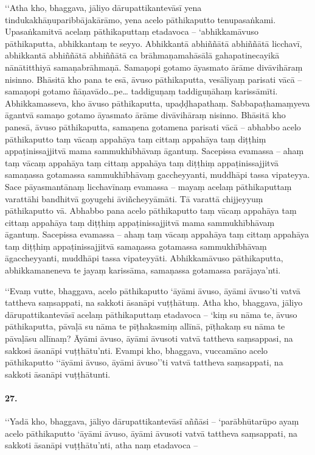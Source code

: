 ‘‘Atha kho, bhaggava, jāliyo dārupattikantevāsī yena tindukakhāṇuparibbājakārāmo, yena acelo pāthikaputto tenupasaṅkami. Upasaṅkamitvā acelaṃ pāthikaputtaṃ etadavoca – ‘abhikkamāvuso pāthikaputta, abhikkantaṃ te seyyo. Abhikkantā abhiññātā abhiññātā licchavī, abhikkantā abhiññātā abhiññātā ca brāhmaṇamahāsālā gahapatinecayikā nānātitthiyā samaṇabrāhmaṇā. Samaṇopi gotamo āyasmato ārāme divāvihāraṃ nisinno. Bhāsitā kho pana te esā, āvuso pāthikaputta, vesāliyaṃ parisati vācā – samaṇopi gotamo ñāṇavādo…pe… taddiguṇaṃ taddiguṇāhaṃ karissāmīti. Abhikkamasseva, kho āvuso pāthikaputta, upaḍḍhapathaṃ. Sabbapaṭhamaṃyeva āgantvā samaṇo gotamo āyasmato ārāme divāvihāraṃ nisinno. Bhāsitā kho panesā, āvuso pāthikaputta, samaṇena gotamena parisati vācā – abhabbo acelo pāthikaputto taṃ vācaṃ appahāya taṃ cittaṃ appahāya taṃ diṭṭhiṃ appaṭinissajjitvā mama sammukhībhāvaṃ āgantuṃ. Sacepissa evamassa – ahaṃ taṃ vācaṃ appahāya taṃ cittaṃ appahāya taṃ diṭṭhiṃ appaṭinissajjitvā samaṇassa gotamassa sammukhībhāvaṃ gaccheyyanti, muddhāpi tassa vipateyya. Sace pāyasmantānaṃ licchavīnaṃ evamassa – mayaṃ acelaṃ pāthikaputtaṃ varattāhi bandhitvā goyugehi āviñcheyyāmāti. Tā varattā chijjeyyuṃ pāthikaputto vā. Abhabbo pana acelo pāthikaputto taṃ vācaṃ appahāya taṃ cittaṃ appahāya taṃ diṭṭhiṃ appaṭinissajjitvā mama sammukhībhāvaṃ āgantuṃ. Sacepissa evamassa – ahaṃ taṃ vācaṃ appahāya taṃ cittaṃ appahāya taṃ diṭṭhiṃ appaṭinissajjitvā samaṇassa gotamassa sammukhībhāvaṃ āgaccheyyanti, muddhāpi tassa vipateyyāti. Abhikkamāvuso pāthikaputta, abhikkamaneneva te jayaṃ karissāma, samaṇassa gotamassa parājaya’nti.

‘‘Evaṃ vutte, bhaggava, acelo pāthikaputto ‘āyāmi āvuso, āyāmi āvuso’ti vatvā tattheva saṃsappati, na sakkoti āsanāpi vuṭṭhātuṃ. Atha kho, bhaggava, jāliyo dārupattikantevāsī acelaṃ pāthikaputtaṃ etadavoca – ‘kiṃ su nāma te, āvuso pāthikaputta, pāvaḷā su nāma te pīṭhakasmiṃ allīnā, pīṭhakaṃ su nāma te pāvaḷāsu allīnaṃ? Āyāmi āvuso, āyāmi āvusoti vatvā tattheva saṃsappasi, na sakkosi āsanāpi vuṭṭhātu’nti. Evampi kho, bhaggava, vuccamāno acelo pāthikaputto ‘‘āyāmi āvuso, āyāmi āvuso’’ti vatvā tattheva saṃsappati, na sakkoti āsanāpi vuṭṭhātunti.

\paragraph{27.} ‘‘Yadā kho, bhaggava, jāliyo dārupattikantevāsī aññāsi – ‘parābhūtarūpo ayaṃ acelo pāthikaputto ‘āyāmi āvuso, āyāmi āvusoti vatvā tattheva saṃsappati, na sakkoti āsanāpi vuṭṭhātu’nti, atha naṃ etadavoca –

